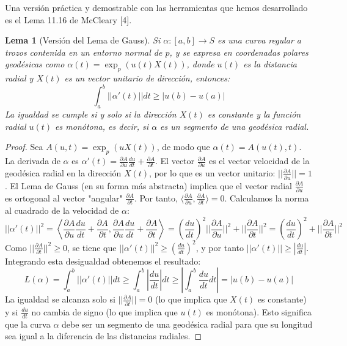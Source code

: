 \documentclass[12pt, a4paper]{report}
\theoremstyle{miestilo}
\newtheorem{lema}[teorema]{Lema}
\theoremstyle{midefinicion}
\begin{document}
Una versión práctica y demostrable con las herramientas que hemos desarrollado es el Lema 11.16 de McCleary [4].

\begin{lema}[Versión del Lema de Gauss]
Si $\alpha:[a,b]\to S$ es una curva regular a trozos contenida en un entorno normal de $p$, y se expresa en coordenadas polares geodésicas como $\alpha(t) = \exp_p(u(t)X(t))$, donde $u(t)$ es la distancia radial y $X(t)$ es un vector unitario de dirección, entonces:
$$\int_a^b ||\alpha'(t)|| dt \ge |u(b) - u(a)|$$
La igualdad se cumple si y solo si la dirección $X(t)$ es constante y la función radial $u(t)$ es monótona, es decir, si $\alpha$ es un segmento de una geodésica radial.
\end{lema}

\begin{proof}
Sea $A(u,t) = \exp_p(uX(t))$, de modo que $\alpha(t) = A(u(t), t)$. La derivada de $\alpha$ es $\alpha'(t) = \frac{\partial A}{\partial u}\frac{du}{dt} + \frac{\partial A}{\partial t}$.
El vector $\frac{\partial A}{\partial u}$ es el vector velocidad de la geodésica radial en la dirección $X(t)$, por lo que es un vector unitario: $||\frac{\partial A}{\partial u}||=1$.
El Lema de Gauss (en su forma más abstracta) implica que el vector radial $\frac{\partial A}{\partial u}$ es ortogonal al vector "angular" $\frac{\partial A}{\partial t}$. Por tanto, $\langle \frac{\partial A}{\partial u}, \frac{\partial A}{\partial t} \rangle = 0$.
Calculamos la norma al cuadrado de la velocidad de $\alpha$:
$$ ||\alpha'(t)||^2 = \left\langle \frac{\partial A}{\partial u}\frac{du}{dt} + \frac{\partial A}{\partial t}, \frac{\partial A}{\partial u}\frac{du}{dt} + \frac{\partial A}{\partial t} \right\rangle = \left(\frac{du}{dt}\right)^2 ||\frac{\partial A}{\partial u}||^2 + ||\frac{\partial A}{\partial t}||^2 = \left(\frac{du}{dt}\right)^2 + ||\frac{\partial A}{\partial t}||^2 $$
Como $||\frac{\partial A}{\partial t}||^2 \ge 0$, se tiene que $||\alpha'(t)||^2 \ge (\frac{du}{dt})^2$, y por tanto $||\alpha'(t)|| \ge |\frac{du}{dt}|$.
Integrando esta desigualdad obtenemos el resultado:
$$ L(\alpha) = \int_a^b ||\alpha'(t)|| dt \ge \int_a^b \left|\frac{du}{dt}\right| dt \ge \left|\int_a^b \frac{du}{dt} dt\right| = |u(b) - u(a)| $$
La igualdad se alcanza solo si $||\frac{\partial A}{\partial t}|| = 0$ (lo que implica que $X(t)$ es constante) y si $\frac{du}{dt}$ no cambia de signo (lo que implica que $u(t)$ es monótona). Esto significa que la curva $\alpha$ debe ser un segmento de una geodésica radial para que su longitud sea igual a la diferencia de las distancias radiales.
\end{proof}
\end{document}
